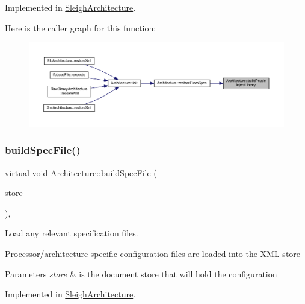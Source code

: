 Implemented in \mbox{\hyperlink{class_sleigh_architecture_ae0b7773ee748ea290358c389e71f2003}{Sleigh\+Architecture}}.

Here is the caller graph for this function\+:
\nopagebreak
\begin{figure}[H]
\begin{center}
\leavevmode
\includegraphics[width=350pt]{class_architecture_a7dae4f59e2c196a623b45e68cacc1a7a_icgraph}
\end{center}
\end{figure}
\mbox{\label{class_architecture_ad9e8edfa21e63d4b37b8003397804933}} 
\subsubsection{\texorpdfstring{buildSpecFile()}{buildSpecFile()}}
{\footnotesize\ttfamily virtual void Architecture\+::build\+Spec\+File (\begin{DoxyParamCaption}\item[{\mbox{\hyperlink{class_document_storage}{Document\+Storage}} \&}]{store }\end{DoxyParamCaption})\hspace{0.3cm}{\ttfamily [protected]}, {}}



Load any relevant specification files. 

Processor/architecture specific configuration files are loaded into the X\+ML store 
\begin{DoxyParams}{Parameters}
{\em store} & is the document store that will hold the configuration \\
\hline
\end{DoxyParams}


Implemented in \mbox{\hyperlink{class_sleigh_architecture_a80e8e72ca0059be816575262b7db395f}{Sleigh\+Architecture}}.

